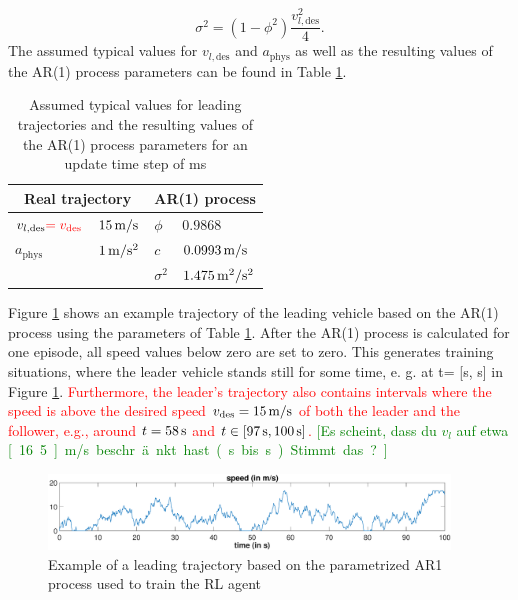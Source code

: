 \documentclass[review]{elsarticle}
\providecommand{\red}[1]{\textcolor{red}{#1}}
\providecommand{\green}[1]{\textcolor{green}{#1}}
\providecommand{\martin}[1]{\red{#1}} %
\providecommand{\martinc}[1]{\green{[#1]}} %
\providecommand{\sub}[1]{_{\mathrm{#1}}}  %
\providecommand{\3}{{\ss}}
\begin{document}
\begin{equation}
\sigma^2=(1-\phi^2)\frac{v_{l,\text{des}}^2}{4}.
\end{equation}
The assumed typical values for $v_{l,\text{des}}$ and  $a\sub{phys}$ as well as the resulting values of the AR(1) process parameters can be found in Table \ref{tab:AR1Parameters}.
%
\begin{table}
	\caption{Assumed typical values for leading trajectories and
		the resulting values of the AR(1) process parameters for an
		update time step of \unit[100]{ms}} 
	\label{tab:AR1Parameters} 
	\begin{center}
		\begin{tabular}{ p{} p{} |p{} p{}  }
			\multicolumn{2}{c|}{Real trajectory} & \multicolumn{2}{c}{AR(1) process}   \\ \hline
			$v_{l,\text{des}}\martin{=v\sub{des}}$ &$\unit[15]{m/s}$ &$\phi$ & $0.9868$\\
			$a\sub{phys}$ &$\unit[1]{m/s^2}$ &$c$ & $\unit[0.0993]{m/s}$\\
			& & $\sigma^2$ & $\unit[1.475]{m^2/s^2}$
			
		\end{tabular}
	\end{center}
\end{table}
%
Figure \ref{fig:AR1process} shows an example trajectory of the leading
vehicle based on the AR(1) process using the parameters of Table
\ref{tab:AR1Parameters}. After the AR(1) process is calculated for one
episode, all speed values below zero are set to zero. This generates
training situations, where the leader vehicle stands still for some
time, e. g. at t= [\unit[48]{s}, \unit[50]{s}] in Figure
\ref{fig:AR1process}. \martin{Furthermore, the leader's trajectory
  also contains intervals where the speed is above the desired speed
  $v\sub{des}=\unit[15]{m/s}$ of both the leader and the follower,
  e.g., around $t=\unit[58]{s}$ and $t\in [\unit[97]{s},
    \unit[100]{s}]$.}
\martinc{Es scheint, dass du $v_l$ auf etwa \unit[16.5]{m/s}
  beschr\"ankt hast (\unit[97]{s} bis \unit[99]{s}). Stimmt das?}   
\begin{figure}
	\centering
	\includegraphics[width=0.95\textwidth]{images/AR1process}
	\caption{Example of a leading trajectory based on the parametrized AR1 process used to train the RL agent}
	\label{fig:AR1process}
\end{figure}
%
%
%
\end{document}
